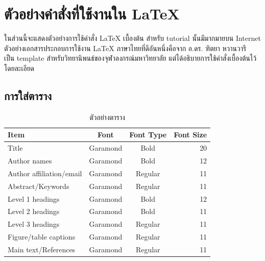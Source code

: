 \documentclass[11pt,a4paper]{article}
\begin{document}
\section{ตัวอย่างคำสั่งที่ใช้งานใน LaTeX}
ในส่วนนี้จะแสดงตัวอย่างการใช้คำสั่ง LaTeX เบื้องต้น สำหรับ tutorial นั้นมีมากมายบน Internet ตัวอย่างเอกสารประกอบการใช้งาน LaTeX ภาษาไทยที่ดีอันหนึ่งคือจาก อ.ดร. ฑิตยา หวานวารี~\cite{cuthesis} เป็น template สำหรับวิทยานิพนธ์ของจุฬาลงกรณ์มหาวิทยาลัย แต่ได้อธิบายการใช้คำสั่งเบื้องต้นไว้โดยละเอียด

\subsection{การใส่ตาราง}
\begin{table}[ht]
    \centering
    \caption{ตัวอย่างตาราง}
    \vspace{3mm}
    \begin{tabular}{|l|c|c|r|} \hline
        Item                     & Font     & Font Type & Font Size \\ \hline
        Title                    & Garamond & Bold      & 20        \\
        Author names             & Garamond & Bold      & 12        \\
        Author affiliation/email & Garamond & Regular   & 11        \\
        Abstract/Keywords        & Garamond & Regular   & 11        \\
        Level 1 headings         & Garamond & Bold      & 12        \\
        Level 2 headings         & Garamond & Bold      & 11        \\
        Level 3 headings         & Garamond & Regular   & 11        \\
        Figure/table captions    & Garamond & Regular   & 11        \\
        Main text/References     & Garamond & Regular   & 11        \\ \hline
    \end{tabular}
\end{table}
\end{document}
